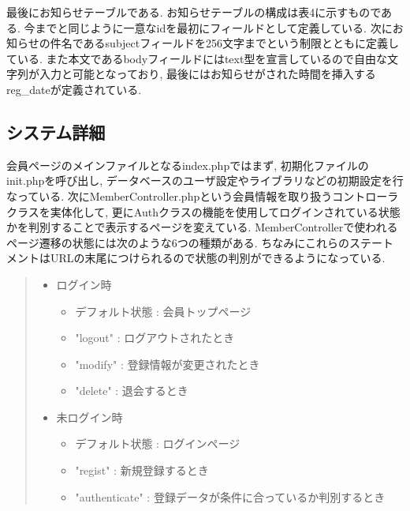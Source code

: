 \documentclass[submit,techrep]{ipsj}
\begin{document}
最後にお知らせテーブルである. お知らせテーブルの構成は表4に示すものである. 今までと同じように一意なidを最初にフィールドとして定義している. 次にお知らせの件名であるsubjectフィールドを256文字までという制限とともに定義している. 
また本文であるbodyフィールドにはtext型を宣言しているので自由な文字列が入力と可能となっており, 最後にはお知らせがされた時間を挿入するreg\_dateが定義されている. 

\begin{table}[htb]
\centering
  \caption{お知らせテーブル構成}
\end{table}


\subsection{システム詳細}
会員ページのメインファイルとなるindex.phpではまず, 初期化ファイルのinit.phpを呼び出し, データベースのユーザ設定やライブラリなどの初期設定を行なっている. 
次にMemberController.phpという会員情報を取り扱うコントローラクラスを実体化して, 更にAuthクラスの機能を使用してログインされている状態かを判別することで表示するページを変えている. MemberControllerで使われるページ遷移の状態には次のような6つの種類がある. ちなみにこれらのステートメントはURLの末尾につけられるので状態の判別ができるようになっている. 
\begin{quote}
 \begin{itemize}
  \item ログイン時
   \begin{itemize}
    \item デフォルト状態 : 会員トップページ
    \item "logout" : ログアウトされたとき
    \item "modify" : 登録情報が変更されたとき
    \item "delete" : 退会するとき
   \end{itemize}
 \item 未ログイン時
   \begin{itemize}
    \item デフォルト状態 : ログインページ
    \item "regist" : 新規登録するとき
    \item "authenticate" : 登録データが条件に合っているか判別するとき
   \end{itemize}
 \end{itemize}
\end{quote}
\end{document}
